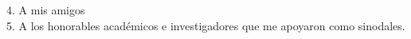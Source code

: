 \documentclass[
12pt, %
spanish, %
singlespacing, %
headsepline, %
]{MastersDoctoralThesis} %
\begin{document}
\begin{acknowledgements}
4. A mis amigos\\





5. A los honorables académicos e investigadores que me apoyaron como sinodales.\\





\end{acknowledgements}
\end{document}
